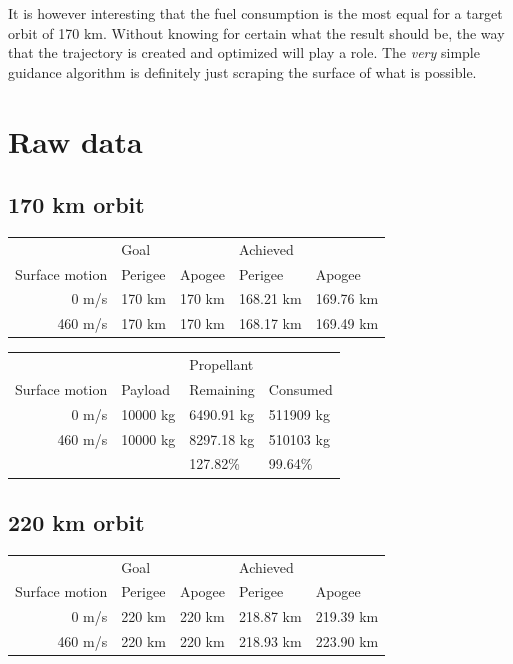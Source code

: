 \documentclass[11pt]{article}
\begin{document}
It is however interesting that the fuel consumption is the most equal for a target orbit of 170 km. Without knowing for certain what the result should be, the way that the trajectory is created and optimized will 
play a role. The \textit{very} simple guidance algorithm is definitely just scraping the surface of what is possible.

\newpage

\appendix

\section{Raw data}
\subsection{170 km orbit}
\begin{center}
  \begin{tabular}{ r | l   l | l   l }
     & Goal  &  & Achieved &  \\
    Surface motion & Perigee & Apogee & Perigee & Apogee \\
    \hline
    0 m/s & 170 km & 170 km & 168.21 km & 169.76 km \\
    460 m/s & 170 km & 170 km & 168.17 km & 169.49 km
  \end{tabular}
\end{center}

\begin{center}
  \begin{tabular}{ r   l   l l }
     &  & Propellant &  \\
    Surface motion & Payload & Remaining & Consumed \\
    \hline
    0 m/s & 10000 kg & 6490.91 kg  & 511909 kg \\
    460 m/s & 10000 kg & 8297.18 kg  & 510103 kg \\
    \hline
      &   & 127.82\%  & 99.64\% \\
  \end{tabular}
\end{center}

\subsection{220 km orbit}
\begin{center}
  \begin{tabular}{ r | l   l | l   l }
     & Goal  &  & Achieved &  \\
    Surface motion & Perigee & Apogee & Perigee & Apogee \\
    \hline
    0 m/s & 220 km & 220 km & 218.87 km & 219.39 km \\
    460 m/s & 220 km & 220 km & 218.93 km & 223.90 km
  \end{tabular}
\end{center}
\end{document}
